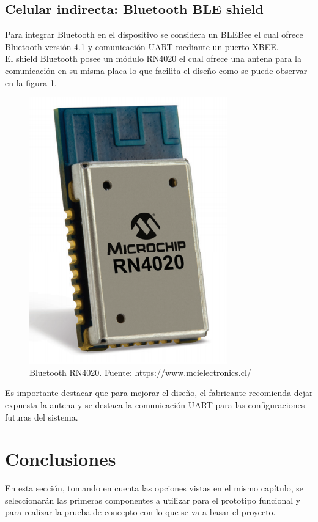 \subsection{Celular indirecta: Bluetooth BLE shield}
Para integrar Bluetooth en el dispositivo se considera un BLEBee el cual ofrece Bluetooth versión 4.1 y comunicación UART mediante un puerto XBEE. \\
El shield Bluetooth posee un módulo RN4020\cite{RN4020} el cual ofrece una antena para la comunicación en su misma placa lo que facilita el diseño como se puede observar en la figura \ref{bt}.

\begin{figure}[H]
	\centering
	\includegraphics[scale=0.5]{figuras/com/rn4020.png}
	\caption{Bluetooth RN4020. Fuente: https://www.mcielectronics.cl/}
	\label{bt}
\end{figure}

Es importante destacar que para mejorar el diseño, el fabricante recomienda dejar expuesta la antena y se destaca la comunicación UART para las configuraciones futuras del sistema.

\newpage

\section{Conclusiones}
En esta sección, tomando en cuenta las opciones vistas en el mismo capítulo, se seleccionarán las primeras componentes a utilizar para el prototipo funcional y para realizar la prueba de concepto con lo que se va a basar el proyecto.
